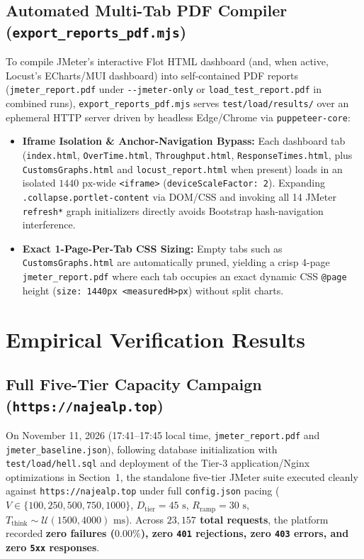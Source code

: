 \documentclass[11pt,letterpaper]{article}
\begin{document}
\subsection{Automated Multi-Tab PDF Compiler (\texttt{export\_reports\_pdf.mjs})}
To compile JMeter's interactive Flot HTML dashboard (and, when active, Locust's ECharts/MUI dashboard) into self-contained PDF reports (\texttt{jmeter\_report.pdf} under \texttt{-{}-jmeter-only} or \texttt{load\_test\_report.pdf} in combined runs), \texttt{export\_reports\_pdf.mjs} serves \texttt{test/load/results/} over an ephemeral HTTP server driven by headless Edge/Chrome via \texttt{puppeteer-core}:
\begin{itemize}
  \item \textbf{Iframe Isolation \& Anchor-Navigation Bypass:} Each dashboard tab (\texttt{index.html}, \texttt{OverTime.html}, \texttt{Throughput.html}, \texttt{ResponseTimes.html}, plus \texttt{CustomsGraphs.html} and \texttt{locust\_report.html} when present) loads in an isolated $1440\text{ px}$-wide \texttt{<iframe>} (\texttt{deviceScaleFactor: 2}). Expanding \texttt{.collapse.portlet-content} via DOM/CSS and invoking all 14 JMeter \texttt{refresh*} graph initializers directly avoids Bootstrap hash-navigation interference.
  \item \textbf{Exact 1-Page-Per-Tab CSS Sizing:} Empty tabs such as \texttt{CustomsGraphs.html} are automatically pruned, yielding a crisp 4-page \texttt{jmeter\_report.pdf} where each tab occupies an exact dynamic CSS \texttt{@page} height (\texttt{size: 1440px <measuredH>px}) without split charts.
\end{itemize}

\section{Empirical Verification Results}
\label{sec:results}

\subsection{Full Five-Tier Capacity Campaign (\texttt{https://najealp.top})}
On November 11, 2026 (17:41--17:45 local time, \texttt{jmeter\_report.pdf} and \texttt{jmeter\_baseline.json}), following database initialization with \texttt{test/load/hell.sql} and deployment of the Tier-3 application/Nginx optimizations in Section~1, the standalone five-tier JMeter suite executed cleanly against \texttt{https://najealp.top} under full \texttt{config.json} pacing ($V \in \{100, 250, 500, 750, 1000\}$, $D_{\text{tier}} = 45\text{ s}$, $R_{\text{ramp}} = 30\text{ s}$, $T_{\text{think}} \sim \mathcal{U}(1500, 4000)\text{ ms}$). Across \textbf{$23{,}157$ total requests}, the platform recorded \textbf{zero failures ($0.00\%$), zero \texttt{401} rejections, zero \texttt{403} errors, and zero \texttt{5xx} responses}.
\end{document}
